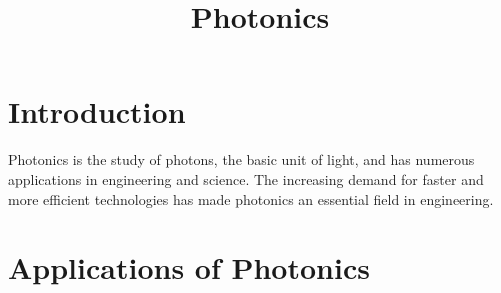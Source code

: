 \documentclass[a4paper]{article}
\title{Photonics}
\begin{document}
    \maketitle
    \section{Introduction}

    Photonics is the study of photons, the basic unit of light, and has numerous applications in engineering and science. The increasing demand for faster and more efficient technologies has made photonics an essential field in engineering.

    \section{Applications of Photonics}
\end{document}
